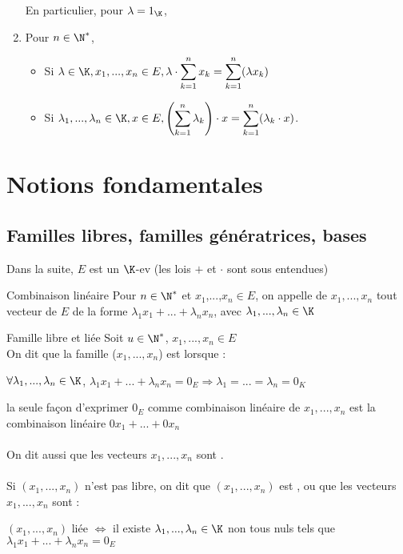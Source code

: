 \documentclass[12pt, a4paper]{report}
\begin{document}
\begin{enumerate}
	En particulier, pour $\lambda = 1_\K$, 
	
	
	\item Pour $n \in \N^*$,
	
	\begin{itemize}
		
		\item Si $\lambda \in \K, x_1,...,x_n \in E, \lambda \cdot \displaystyle{\sum_{k=1}^n x_k = \sum_{k=1}^n (\lambda x_k)}$
		
		\item Si $\lambda_1,...,\lambda_n \in \K, x \in E, \left(\displaystyle{\sum_{k=1}^n \lambda_k }\right) \cdot x = \displaystyle{\sum_{k=1}^n (\lambda_k \cdot x)}$.

	\end{itemize}

\end{enumerate}

\section{Notions fondamentales}
\subsection{Familles libres, familles génératrices, bases}
Dans la suite, $E$ est un $\K$-ev (les lois $+$ et $\cdot$ sont sous entendues)

\begin{definition}{Combinaison linéaire}{}
Pour $n\in \N^*$ et $x_1$,...,$x_n \in E$, on appelle  de $x_1,..., x_n$ tout vecteur de $E$ de la forme $\lambda_1 x_1 + ... + \lambda_n x_n$, avec $\lambda_1, ..., \lambda_n \in \K$
\end{definition}

\begin{definition}{Famille libre et liée}{}
Soit $u\in \N^*$, $x_1,...,x_n \in E$\\
On dit que la famille ($x_1,...,x_n$) est  lorsque :
\begin{center}
    $\forall \lambda_1, ..., \lambda_n \in \K$, $\lambda_1 x_1+...+\lambda_n x_n = 0_E \Longrightarrow \lambda_1 = ... = \lambda_n = 0_K$
\end{center}
\ie la seule façon d'exprimer $0_E$ comme combinaison linéaire de $x_1, ... , x_n$ est la combinaison linéaire $0x_1 + ... + 0x_n$\\
\\
On dit aussi que les vecteurs $x_1,...,x_n$ sont .\\
\\
Si $(x_1,...,x_n)$ n'est pas libre, on dit que $(x_1,...,x_n)$ est , ou que les vecteurs $x_1,...,x_n$ sont  :
\begin{center}
    $(x_1,...,x_n)$ liée $\Longleftrightarrow$ il existe $\lambda_1,...,\lambda_n \in \K$ non tous nuls tels que $\lambda_1 x_1 + ... + \lambda_n x_n = 0_E$
\end{center}
\end{definition}
\end{document}
